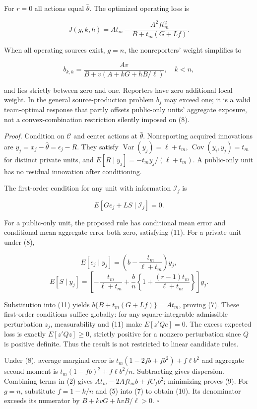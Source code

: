 \documentclass[
  11pt,
]{article}
\begin{document}
For \(r=0\) all actions equal \(\widehat\theta\). The optimized
operating loss is

\[J(g,k,h)=At_m-\frac{A^2 f t_m^2}{B+t_m(G+Lf)}. \tag{9}\]

When all operating sources exist, \(g=n\), the nonreporters' weight
simplifies to

\[b_{k,h}=\frac{Av}{B+v(A+kG+h B/\ell)},\quad k<n, \tag{10}\]

and lies strictly between zero and one. Reporters have zero additional
local weight. In the general source-production problem \(b_f\) may
exceed one; it is a valid team-optimal response that partly offsets
public-only units' aggregate exposure, not a convex-combination
restriction silently imposed on (8).

\emph{Proof.} Condition on \(\mathcal C\) and center actions at
\(\widehat\theta\). Nonreporting acquired innovations are
\(y_j=x_j-\widehat\theta=\epsilon_j-R\). They satisfy
\(\operatorname{Var}(y_j)=\ell+t_m\),
\(\operatorname{Cov}(y_i,y_j)=t_m\) for distinct private units, and
\(E[R\mid y_j]=-t_m y_j/(\ell+t_m)\). A public-only unit has no residual
innovation after conditioning.

The first-order condition for any unit with information \(\mathcal I_j\)
is

\[E[Ge_j+LS\mid\mathcal I_j]=0. \tag{11}\]

For a public-only unit, the proposed rule has conditional mean error and
conditional mean aggregate error both zero, satisfying (11). For a
private unit under (8),

\[E[e_j\mid y_j]=\left(b-\frac{t_m}{\ell+t_m}\right)y_j,\]
\[E[S\mid y_j]=\left[-\frac{t_m}{\ell+t_m}
+\frac b n\left\{1+\frac{(r-1)t_m}{\ell+t_m}\right\}\right]y_j.\]

Substitution into (11) yields \(b\{B+t_m(G+Lf)\}=At_m\), proving (7).
These first-order conditions suffice globally: for any square-integrable
admissible perturbation \(z_j\), measurability and (11) make
\(E[z'Qe]=0\). The excess expected loss is exactly \(E[z'Qz]\geq0\),
strictly positive for a nonzero perturbation since \(Q\) is positive
definite. Thus the result is not restricted to linear candidate rules.

Under (8), average marginal error is \(t_m(1-2fb+fb^2)+f\ell b^2\) and
aggregate second moment is \(t_m(1-fb)^2+f\ell b^2/n\). Subtracting
gives dispersion. Combining terms in (2) gives
\(At_m-2Af t_m b+fC_fb^2\); minimizing proves (9). For \(g=n\),
substitute \(f=1-k/n\) and (5) into (7) to obtain (10). Its denominator
exceeds its numerator by \(B+kvG+hvB/\ell>0\). \(\square\)
\end{document}
